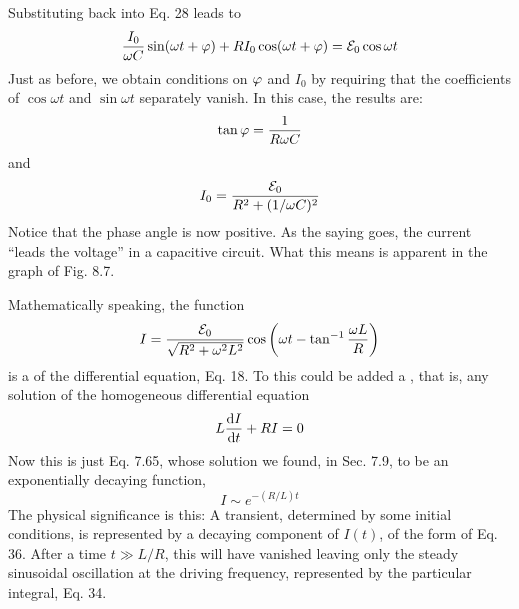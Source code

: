 
Substituting back into Eq. 28 leads to
\begin{equation}
  \frac{I_0}{\omega C} \sin(\omega t+\varphi) + R I_0\cos(\omega t+\varphi) = \mathcal{E}_0\cos\omega t
\end{equation}
Just as before, we obtain conditions on $\varphi$ and $I_0$ by requiring that the
coefficients of $\cos \omega t$ and $\sin \omega t$ separately vanish. In this case, the
results are:
\begin{equation}
  \tan\varphi = \frac{1}{R\omega C}  
\end{equation}
and
\begin{equation}
  I_0 = \frac{\mathcal{E}_0}{R^2+(1/\omega C)^2}
\end{equation}
Notice that the phase angle is now positive. As the saying goes, the
current ``leads the voltage'' in a capacitive circuit. What this means
is apparent in the graph of Fig. 8.7.

Mathematically speaking, the function
\begin{equation}
  I = \frac{\mathcal{E}_0}{\sqrt{R^2+\omega^2L^2}}\cos\left(\omega t-\tan^{-1}\frac{\omega L}{R}\right)
\end{equation}
is a  of the differential equation, Eq. 18. To this
could be added a , that is, any solution of
the homogeneous differential equation
\begin{equation}
  L\frac{\textup{d} I}{\textup{d} t} + RI = 0
\end{equation}
Now this is just Eq. 7.65, whose solution we found, in Sec. 7.9, to be
an exponentially decaying function,
\begin{equation}
  I \sim e^{-(R/L)t}
\end{equation}
The physical significance is this: A transient, determined by some
initial conditions, is represented by a decaying component of $I (t)$,
of the form of Eq. 36. After a time $t \gg L/R$, this will have vanished
leaving only the steady sinusoidal oscillation at the driving frequency,
represented by the particular integral, Eq. 34.

